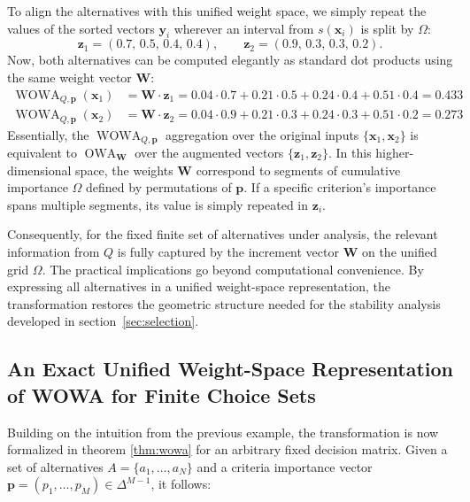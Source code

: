 \begin{example}
To align the alternatives with this unified weight space, we simply repeat the values of the sorted vectors $\mathbf{y}_i$ wherever an interval from $s(\mathbf{x}_i)$ is split by $\Omega$:
\[
\mathbf{z}_1 = (0.7,\, 0.5,\, 0.4,\, 0.4), \qquad \mathbf{z}_2 = (0.9,\, 0.3,\, 0.3,\, 0.2).
\]
Now, both alternatives can be computed elegantly as standard dot products using the same weight vector $\mathbf{W}$:
\begin{align*}
\operatorname{WOWA}_{Q,\mathbf{p}}(\mathbf{x}_1) &= \mathbf{W} \cdot \mathbf{z}_1 = 0.04 \cdot 0.7 + 0.21 \cdot 0.5 + 0.24 \cdot 0.4 + 0.51 \cdot 0.4 = 0.433 \\
\operatorname{WOWA}_{Q,\mathbf{p}}(\mathbf{x}_2) &= \mathbf{W} \cdot \mathbf{z}_2 = 0.04 \cdot 0.9 + 0.21 \cdot 0.3 + 0.24 \cdot 0.3 + 0.51 \cdot 0.2 = 0.273
\end{align*}
Essentially, the $\operatorname{WOWA}_{Q,\mathbf{p}}$ aggregation over the original inputs $\{\mathbf{x}_1, \mathbf{x}_2\}$ is equivalent to $\operatorname{OWA}_{\mathbf{W}}$ over the augmented vectors $\{\mathbf{z}_1, \mathbf{z}_2\}$. In this higher-dimensional space, the weights $\mathbf{W}$ correspond to segments of cumulative importance $\Omega$ defined by permutations of $\mathbf{p}$. If a specific criterion's importance spans multiple segments, its value is simply repeated in $\mathbf{z}_i$.
\end{example}
Consequently, for the fixed finite set of alternatives under analysis, the relevant information from $Q$ is fully captured by the increment vector $\mathbf{W}$ on the unified grid $\Omega$. The practical implications go beyond computational convenience. By expressing all alternatives in a unified weight-space representation, the transformation restores the geometric structure needed for the stability analysis developed in section~\ref{sec:selection}.



\subsection{An Exact Unified Weight-Space Representation of WOWA for Finite Choice Sets}
\label{sec:wowa_theorem}

Building on the intuition from the previous example, the transformation is now formalized in theorem \ref{thm:wowa} for an arbitrary fixed decision matrix. Given a set of alternatives $A = \{a_1, \dots, a_N\}$ and a criteria importance vector $\mathbf{p} = (p_1, \dots, p_M)\in \Delta^{M-1}$, it follows:


